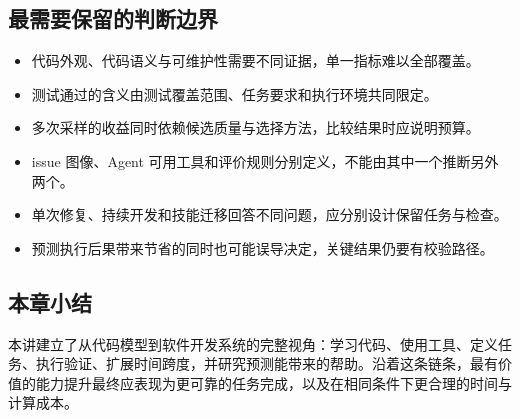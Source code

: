\documentclass[11pt,a4paper]{article}
\begin{document}
\subsection{最需要保留的判断边界}
\begin{itemize}\setlength{\itemsep}{2pt}\setlength{\parsep}{0pt}\setlength{\topsep}{4pt}
\item 代码外观、代码语义与可维护性需要不同证据，单一指标难以全部覆盖。
\item 测试通过的含义由测试覆盖范围、任务要求和执行环境共同限定。
\item 多次采样的收益同时依赖候选质量与选择方法，比较结果时应说明预算。
\item issue 图像、Agent 可用工具和评价规则分别定义，不能由其中一个推断另外两个。
\item 单次修复、持续开发和技能迁移回答不同问题，应分别设计保留任务与检查。
\item 预测执行后果带来节省的同时也可能误导决定，关键结果仍要有校验路径。
\end{itemize}

\subsection{本章小结}
本讲建立了从代码模型到软件开发系统的完整视角：学习代码、使用工具、定义任务、执行验证、扩展时间跨度，并研究预测能带来的帮助。沿着这条链条，最有价值的能力提升最终应表现为更可靠的任务完成，以及在相同条件下更合理的时间与计算成本。

\endgroup
\end{document}
